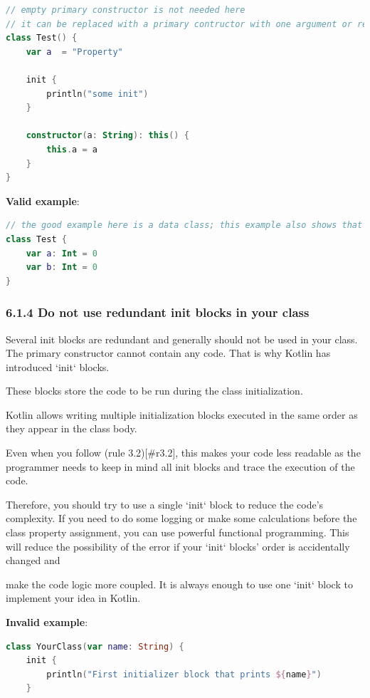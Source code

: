 {{{{\begin{lstlisting}[language=Kotlin]
// empty primary constructor is not needed here
// it can be replaced with a primary contructor with one argument or removed
class Test() {
    var a  = "Property"

    init {
        println("some init")
    }

    constructor(a: String): this() {
        this.a = a
    }
}
\end{lstlisting}


\textbf{Valid example}:

\begin{lstlisting}[language=Kotlin]
// the good example here is a data class; this example also shows that you should get rid of braces for the primary constructor
class Test {
    var a: Int = 0
    var b: Int = 0
}
\end{lstlisting}


\subsubsection*{\textbf{6.1.4 Do not use redundant init blocks in your class}}
\leavevmode\newline

Several init blocks are redundant and generally should not be used in your class. The primary constructor cannot contain any code. That is why Kotlin has introduced `init` blocks.

These blocks store the code to be run during the class initialization.

Kotlin allows writing multiple initialization blocks executed in the same order as they appear in the class body.

Even when you follow (rule 3.2)[\#r3.2], this makes your code less readable as the programmer needs to keep in mind all init blocks and trace the execution of the code.

Therefore, you should try to use a single `init` block to reduce the code's complexity. If you need to do some logging or make some calculations before the class property assignment, you can use powerful functional programming. This will reduce the possibility of the error if your `init` blocks' order is accidentally changed and

make the code logic more coupled. It is always enough to use one `init` block to implement your idea in Kotlin.



\textbf{Invalid example}:

\begin{lstlisting}[language=Kotlin]
class YourClass(var name: String) {    
    init {
        println("First initializer block that prints ${name}")
    }
    

\end{lstlisting}}}}}

